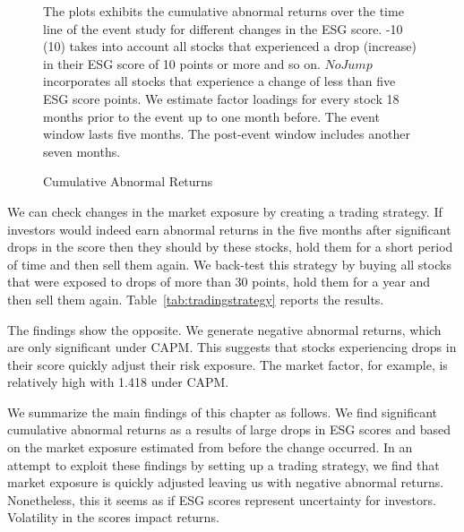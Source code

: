 \documentclass[11pt]{article}
\newcommand\fnote[1]{\captionsetup{font=small}\caption*{#1}}
\begin{document}
\begin{figure}[!htbp]
	\centering
	\caption{Cumulative Abnormal Returns}
	\fnote{The plots exhibits the cumulative abnormal returns over the time line of the event study for different changes in the ESG score. -10 (10) takes into account all stocks that experienced a drop (increase) in their ESG score of 10 points or more and so on. $No Jump$ incorporates all stocks that experience a change of less than five ESG score points. We estimate factor loadings for every stock 18 months prior to the event up to one month before. The event window lasts five months. The post-event window includes another seven months.}
	\label{fig:eventstudy}
	\vspace{-1cm}
\end{figure}


We can check changes in the market exposure by creating a trading strategy. If investors would indeed earn abnormal returns in the five months after significant drops in the score then they should by these stocks, hold them for a short period of time and then sell them again. We back-test this strategy by buying all stocks that were exposed to drops of more than 30 points, hold them for a year and then sell them again. Table~\ref{tab:tradingstrategy} reports the results. 

The findings show the opposite. We generate negative abnormal returns, which are only significant under CAPM. This suggests that stocks experiencing drops in their score quickly adjust their risk exposure. The market factor, for example, is relatively high with 1.418 under CAPM. 

We summarize the main findings of this chapter as follows. We find significant cumulative abnormal returns as a results of large drops in ESG scores and based on the market exposure estimated from before the change occurred. In an attempt to exploit these findings by setting up a trading strategy, we find that market exposure is quickly adjusted leaving us with negative abnormal returns. Nonetheless, this it seems as if ESG scores represent uncertainty for investors. Volatility in the scores impact returns. 
\end{document}

